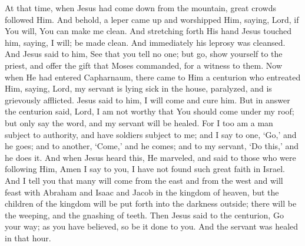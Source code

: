 {{At that time, when Jesus had come down from the mountain, great crowds followed Him. And behold, a leper came up and worshipped Him, saying, Lord, if You will, You can make me clean. And stretching forth His hand Jesus touched him, saying, I will; be made clean. And immediately his leprosy was cleansed. And Jesus said to him, See that you tell no one; but go, show yourself to the priest, and offer the gift that Moses commanded, for a witness to them. Now when He had entered Capharnaum, there came to Him a centurion who entreated Him, saying, Lord, my servant is lying sick in the house, paralyzed, and is grievously afflicted. Jesus said to him, I will come and cure him. But in answer the centurion said, Lord, I am not worthy that You should come under my roof; but only say the word, and my servant will be healed. For I too am a man subject to authority, and have soldiers subject to me; and I say to one, ‘Go,’ and he goes; and to another, ‘Come,’ and he comes; and to my servant, ‘Do this,’ and he does it. And when Jesus heard this, He marveled, and said to those who were following Him, Amen I say to you, I have not found such great faith in Israel. And I tell you that many will come from the east and from the west and will feast with Abraham and Isaac and Jacob in the kingdom of heaven, but the children of the kingdom will be put forth into the darkness outside; there will be the weeping, and the gnashing of teeth. Then Jesus said to the centurion, Go your way; as you have believed, so be it done to you. And the servant was healed in that hour.
  }
}
\newcommand{\offertory}{%
Sanctificávit Móyses altáre Dómino, ófferens super illud holocáusta et ímmolans víctimas: fecit sacrifícium vespertínum in odórem suavitátis Dómino Deo, in conspéctu filiórum Israël.
}
\newcommand{\offertoryTranslation}{%
Moses consecrated an altar to the Lord, offering upon it holocausts, and sacrificing victims: he made an evening sacrifice to the Lord God for an odor of sweetness, in the sight of the Israelites.
}
\newcommand{\secret}{%
  \l{%
Hæc hóstia, Dómine, quǽsumus, emúndet nostra delícta: et, ad sacrifícium celebrándum, subditórum tibi córpora mentésque sanctíficet.
  }
  \e{%
May this offering, O Lord, we beseech You, wipe away our transgressions, and make holy the minds and bodies of Your servants for celebrating this sacrifice.
  }
  \perDominum
}
\newcommand{\communion}{%
Tóllite hóstias, et introíte in átria eius: adoráte Dóminum in aula sancta eius.
}
\newcommand{\communionTranslation}{%
Bring gifts and enter His courts; worship the Lord in His holy court.
}
\newcommand{\postcommunion}{%
  \l{%
Quos tantis, Dómine, largíris uti mystériis: quǽsumus; ut efféctibus nos eórum veráciter aptáre dignéris.
  }
  \e{%
O Lord, as You grant us to use this great sacrament, deign, we beseech You, to make us truly worthy of its fruits.
  }
  \perDominum
}

